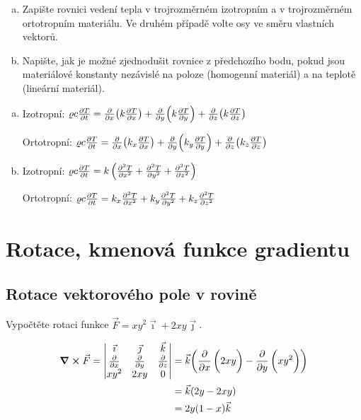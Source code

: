 \begin{enumerate}[a)]
\item Zapište rovnici vedení tepla v trojrozměrném izotropním a v
  trojrozměrném ortotropním materiálu. Ve druhém případě volte osy ve
  směru vlastních vektorů.
\item Napište, jak je možné zjednodušit rovnice z předchozího bodu,
  pokud jsou materiálové konstanty nezávislé na poloze (homogenní
  materiál) a na teplotě (lineární materiál).
\end{enumerate}

\reseni
\begin{enumerate}[a)]
\item Izotropní: $\varrho c \pdv{T}{t} = 
\pdv{x}(k\pdv{T}{x})
+\pdv{y}(k\pdv{T}{y})
+\pdv{z}(k\pdv{T}{z})$

  Ortotropní:
 $\varrho c \pdv{T}{t} = 
\pdv{x}(k_x\pdv{T}{x})
+\pdv{y}(k_y\pdv{T}{y})
+\pdv{z}(k_z\pdv{T}{z})
$
\item Izotropní: $\varrho c \pdv{T}{t} = 
k\left(\pdv[2]{T}{x} + \pdv[2]{T}{y} + \pdv[2]{T}{z}\right)
$

  Ortotropní:
 $\varrho c \pdv{T}{t} = 
k_x\pdv[2]{T}{x}
+k_y\pdv[2]{T}{y}
+k_z\pdv[2]{T}{z}
$
\end{enumerate}
\konec

\section{Rotace, kmenová funkce gradientu}


\subsection{Rotace vektorového pole v rovině}

Vypočtěte rotaci funkce $\vec F=xy^2\vec \imath + 2xy\vec\jmath$.

\reseni

 $$
 \begin{aligned}
\curl \vec F=
 \begin{vmatrix}
   \vec\imath & \vec \jmath & \vec k\\
   \pdv{x} & \pdv{y} & \pdv{z} \\
   xy^2 & 2xy & 0
 \end{vmatrix}
 &=\vec k\qty({\pd[x]{2xy}-\pd[y]{xy^2}})\\&
 =\vec k(2y-2xy)\\&=2y(1-x)\vec k
\end{aligned}
 $$



